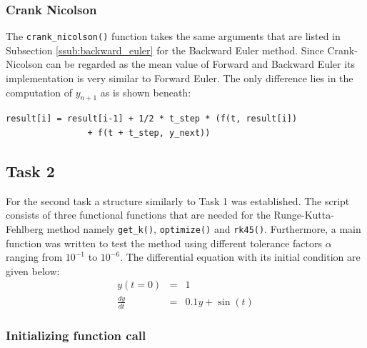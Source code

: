\documentclass{aa}
\begin{document}
\subsubsection*{Crank Nicolson}%
\label{ssub:crank_nicolson}
The \verb+crank_nicolson()+ function takes the same arguments that are listed in Subsection
\ref{ssub:backward_euler} for the Backward Euler method. Since Crank-Nicolson can be regarded
as the mean value of Forward and Backward Euler its implementation is very similar to Forward
Euler. The only difference lies in the computation of \(y_{n+1}\) as is shown beneath:
\begin{lstlisting}[firstnumber=418, name=ode_solvers]
result[i] = result[i-1] + 1/2 * t_step * (f(t, result[i])
                + f(t + t_step, y_next))
\end{lstlisting}

\subsection{Task 2}%
\label{sub:task_2}

For the second task a structure similarly to Task 1 was established. The script consists of
three functional functions that are needed for the Runge-Kutta-Fehlberg method namely
\verb+get_k()+, \verb+optimize()+ and \verb+rk45()+. Furthermore, a main function was written
to test the method using different tolerance factors \(\alpha\) ranging from \(10^{-1}\) to
\(10^{-6}\). The differential equation with its initial condition are given below:
\begin{eqnarray}
    \label{equ:init_cond_2}
    y(t=0) & = & 1 \\ \label{equ:ode_2}
    \frac{dy}{dt} & = & 0.1 y + \sin(t)
\end{eqnarray}

\subsubsection*{Initializing function call}%
\label{ssub:general_function_call}
\end{document}

